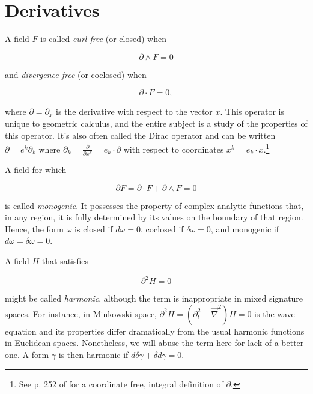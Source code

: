 \documentclass{article}
\begin{document}
\section{Derivatives}

A field $F$ is called \emph{curl free} (or closed) when 

\begin{equation}
  \partial \wedge F = 0
\end{equation}

and \emph{divergence free} (or coclosed) when 

\begin{equation}
  \partial \cdot F = 0,
\end{equation}

where $\partial = \partial_x$ is the derivative with respect to the vector $x$. This operator is unique to geometric calculus, and the entire subject is a study of the properties of this operator. It's also often called the Dirac operator and can be written $\partial = e^k \partial_k$ where $\partial_k = \frac{\partial}{\partial x^k} = e_k \cdot \partial$ with respect to coordinates $x^k = e_k \cdot x$.\footnote{See p. 252 of \cite{cagc} for a coordinate free, integral definition of $\partial$.}

A field for which

\begin{equation}
  \partial F = \partial \cdot F + \partial \wedge F = 0
\end{equation}

is called \emph{monogenic}. It possesses the property of complex analytic functions that, in any region, it is fully determined by its values on the boundary of that region. Hence, the form $\omega$ is closed if $d \omega = 0$, coclosed if $\delta \omega = 0$, and monogenic if $d \omega = \delta \omega = 0$.

A field $H$ that satisfies

\begin{equation}
  \partial^2 H = 0
\end{equation}

might be called \emph{harmonic}, although the term is inappropriate in mixed signature spaces. For instance, in Minkowski space, $\partial^2 H = (\partial_t^2 - \vec \nabla^2) H = 0$ is the wave equation and its properties differ dramatically from the usual harmonic functions in Euclidean spaces. Nonetheless, we will abuse the term here for lack of a better one. A form $\gamma$ is then harmonic if $d \delta \gamma + \delta d \gamma = 0$.
\end{document}
